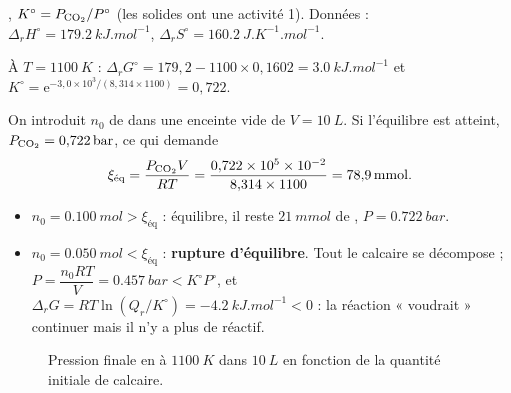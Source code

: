 \begin{exemple}
, $K^\circ = P_{\ce{CO2}}/P^\circ$ (les solides ont une activité 1). Données : $\Delta_rH^\circ = \SI{179,2}{kJ.mol^{-1}}$, $\Delta_rS^\circ = \SI{160,2}{J.K^{-1}.mol^{-1}}$.

\noindent À $T = \SI{1100}{K}$ : $\Delta_rG^\circ = 179{,}2 - 1100\times0{,}1602 = \SI{3,0}{kJ.mol^{-1}}$ et $K^\circ = \mathrm{e}^{-3{,}0\times10^3/(8{,}314\times1100)} = 0{,}722$.

\noindent On introduit $n_0$ de  dans une enceinte vide de $V = \SI{10}{L}$. Si l'équilibre est atteint, $P_{\ce{CO2}} = \SI{0,722}{bar}$, ce qui demande
\[ \xi_{\text{éq}} = \frac{P_{\ce{CO2}}V}{RT} = \frac{0{,}722\times10^5\times10^{-2}}{8{,}314\times1100} = \SI{78,9}{mmol}. \]
\begin{itemize}
  \item $n_0 = \SI{0,100}{mol} > \xi_{\text{éq}}$ : équilibre, il reste $\SI{21}{mmol}$ de , $P = \SI{0,722}{bar}$.
  \item $n_0 = \SI{0,050}{mol} < \xi_{\text{éq}}$ : \textbf{rupture d'équilibre}. Tout le calcaire se décompose ; $P = \dfrac{n_0RT}{V} = \SI{0,457}{bar} < K^\circ P^\circ$, et $\Delta_rG = RT\ln(Q_r/K^\circ) = \SI{-4,2}{kJ.mol^{-1}} < 0$ : la réaction « voudrait » continuer mais il n'y a plus de réactif.
\end{itemize}
\end{exemple}

\begin{figure}[H]
\centering
{}
\caption{Pression finale en  à $\SI{1100}{K}$ dans $\SI{10}{L}$ en fonction de la quantité initiale de calcaire.}
\label{fig:caco3}
\end{figure}
